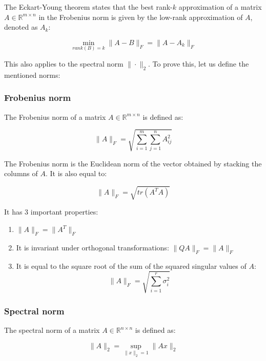 The Eckart-Young theorem states that the best rank-$k$ approximation of a matrix $A \in \mathbb{R}^{m \times n}$ in the Frobenius norm
is given by the low-rank approximation of $A$, denoted as $A_k$:

\begin{equation}
    \min_{rank(B) = k} \|A - B\|_F = \|A - A_k\|_F
\end{equation}

This also applies to the spectral norm $\| \cdot \|_2$. To prove this, let us define the mentioned
norms:

\subsubsection{Frobenius norm}

The Frobenius norm of a matrix $A \in \mathbb{R}^{m \times n}$ is defined as:

\begin{equation}
    \|A\|_F = \sqrt{\sum_{i=1}^{m} \sum_{j=1}^{n} A_{ij}^2}
\end{equation}

The Frobenius norm is the Euclidean norm of the vector obtained by stacking the columns of $A$.
It is also equal to:

\begin{equation}
    \|A\|_F = \sqrt{tr(A^T A)}
\end{equation}

It has 3 important properties:

\begin{enumerate}
    \item $\|A\|_F = \|A^T\|_F$
    \item It is invariant under orthogonal transformations: $\|Q A\|_F = \|A\|_F$
    \item It is equal to the square root of the sum of the squared singular values of $A$: 
    \begin{equation}
        \|A\|_F = \sqrt{\sum_{i=1}^{r} \sigma_i^2}
    \end{equation}
\end{enumerate}

\subsubsection{Spectral norm}

The spectral norm of a matrix $A \in \mathbb{R}^{n \times n}$ is defined as:

\begin{equation}
    \|A\|_2 = \sup_{\|x\|_2 = 1} \|A x\|_2
\end{equation}

